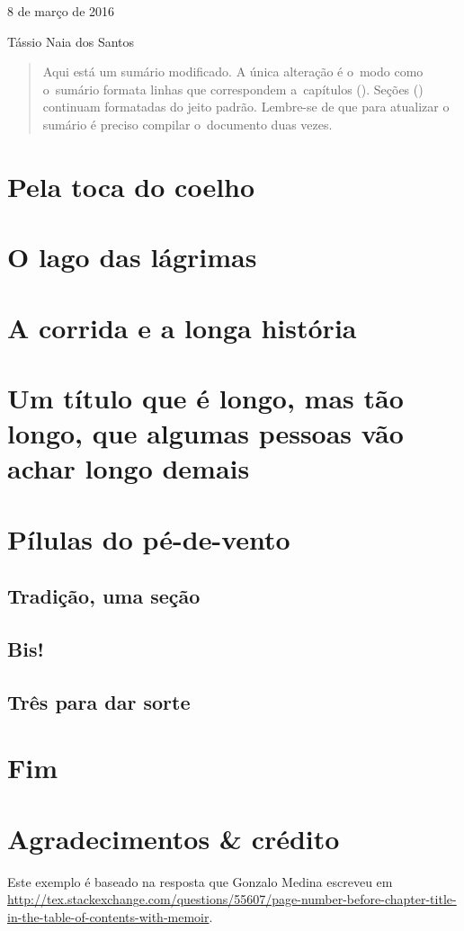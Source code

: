 \documentclass{memoir}
\begin{document}
\hfill 8 de março de 2016

\medskip

\noindent Tássio Naia dos Santos

\medskip

%
%
%


\bigskip

\begin{abstract}
Aqui está um sumário modificado.
A única alteração é o~modo como o~sumário formata linhas 
que correspondem a~capítulos (). 
Seções () continuam formatadas 
do jeito padrão.
Lembre-se de que para atualizar o sumário é preciso compilar
o~documento duas vezes.
\end{abstract}

\tableofcontents*

\chapter{Pela toca do coelho}
\chapter{O lago das lágrimas}
\chapter{A corrida e a longa história}
\setcounter{page}{14}

\chapter{Um título que é longo, mas tão longo, que algumas pessoas vão achar longo demais}
\chapter{Pílulas do pé-de-vento}
\section{Tradição, uma seção}
\section{Bis!}
\section{Três para dar sorte}

\chapter{F\dotfill im}

\chapter*{Agradecimentos \& crédito}

Este exemplo é baseado na resposta que Gonzalo Medina escreveu em \url{http://tex.stackexchange.com/questions/55607/page-number-before-chapter-title-in-the-table-of-contents-with-memoir}.
\end{document}
